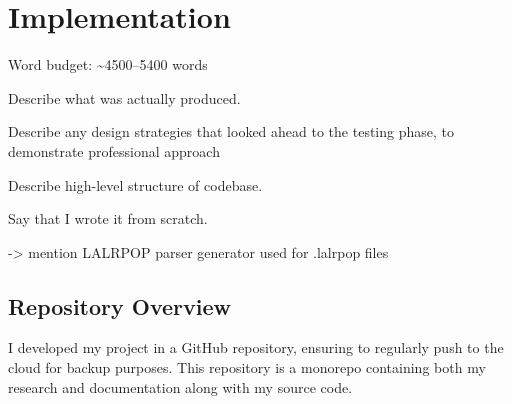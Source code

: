 \documentclass[00-main.tex]{subfiles}
\begin{document}
\chapter{Implementation}

\begin{Comment}
Word budget: \textasciitilde 4500--5400 words
\end{Comment}

\begin{Comment}
Describe what was actually produced.

Describe any design strategies that looked ahead to the testing phase, to demonstrate professional approach
\end{Comment}
\begin{Comment}
Describe high-level structure of codebase.

Say that I wrote it from scratch.

-> mention LALRPOP parser generator used for .lalrpop files
\end{Comment}

\section{Repository Overview}

\newcommand{\DTfile}[1]{\texttt{#1}}
\newcommand{\DTdir}[1]{\textbf{\texttt{#1}}/}

I developed my project in a GitHub repository, ensuring to regularly push to the cloud for backup purposes.
This repository is a monorepo containing both my research and documentation along with my source code.

\DTsetlength{0.2em}{1em}{0.2em}{0.4pt}{2pt}

\makeatletter
\newcommand{\DTdotfill}{\leavevmode \cleaders \hb@xt@ .7em{\hss .\hss }\hfill \kern \z@}
\makeatother
{}
\renewcommand{\DTcomment}[2][8cm]{%
\textcolor{DTdotfillColor}{\DTdotfill}
\rmfamily
\begin{minipage}[t]{#1}
#2
\end{minipage}
\vspace{0.5ex}
}
\newcommand{\DTcommentMl}[2][8cm]{\DTcomment[#1]{#2}\vspace{0.5ex}}
\end{document}
